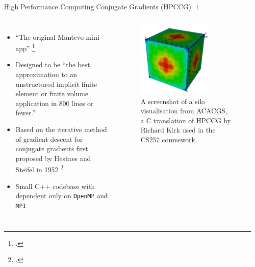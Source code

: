 \documentclass[10pt,aspectratio=169]{beamer}
\begin{document}
\begin{frame}{High Performance Computing Conjugate Gradients (HPCCG) \ i}
    \begin{columns}[onlytextwidth]
            \begin{itemize}
                \item ``The original Mantevo mini-app'' \footcite{MantevoHPCCG2023}
                \item Designed to be ``the best approximation to an unstructured implicit finite element or finite volume application in 800 lines or fewer.''
                \item Based on the iterative method of gradient descent for conjugate gradients first proposed by Hestnes and Steifel in 1952 \footcite{hestenesMethodsConjugateGradients1952}
                \item Small C++ codebase with dependent only on \texttt{OpenMP} and \texttt{MPI}
            \end{itemize}
            \begin{figure}[H]
                \includegraphics[width=0.75\textwidth]{images/acacgs_silo_output.png}
                \captionsetup{width=.9\linewidth}
                \caption{A screenshot of a silo visualisation from ACACGS, a C translation of HPCCG by Richard Kirk used in the CS257 coursework.}
                \label{fig:warwick_mantevo_link}
            \end{figure}
    \end{columns}
\end{frame}
\end{document}
